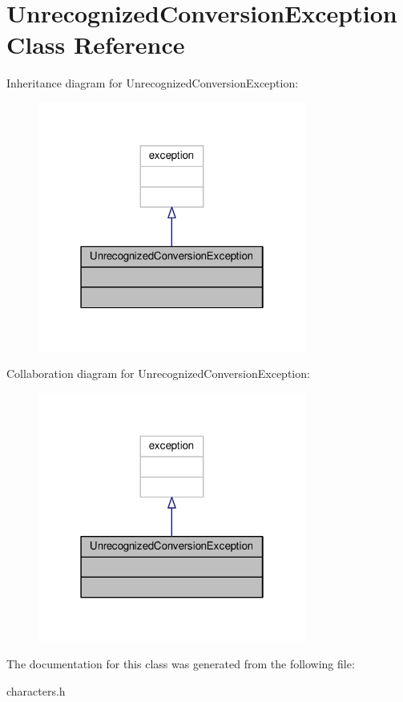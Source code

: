 \hypertarget{class_unrecognized_conversion_exception}{\section{Unrecognized\-Conversion\-Exception Class Reference}
\label{class_unrecognized_conversion_exception}
}


Inheritance diagram for Unrecognized\-Conversion\-Exception\-:
\nopagebreak
\begin{figure}[H]
\begin{center}
\leavevmode
\includegraphics[width=250pt]{class_unrecognized_conversion_exception__inherit__graph}
\end{center}
\end{figure}


Collaboration diagram for Unrecognized\-Conversion\-Exception\-:
\nopagebreak
\begin{figure}[H]
\begin{center}
\leavevmode
\includegraphics[width=250pt]{class_unrecognized_conversion_exception__coll__graph}
\end{center}
\end{figure}


The documentation for this class was generated from the following file\-:\begin{DoxyCompactItemize}
\item 
characters.\-h\end{DoxyCompactItemize}
